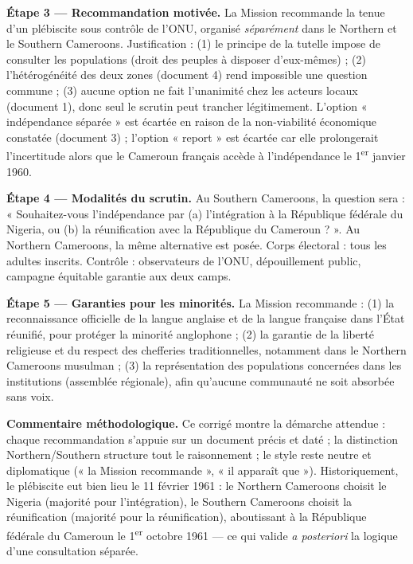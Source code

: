 \documentclass[11pt]{article}
\newcommand{\cle}[1]{{\popxbold\color{popdark}#1}}
\begin{document}
\begin{exoresolu}
\textbf{Étape 3 — Recommandation motivée.} La Mission recommande la tenue d'un \cle{plébiscite sous contrôle de l'ONU}, organisé \emph{séparément} dans le Northern et le Southern Cameroons. Justification : (1) le principe de la tutelle impose de consulter les populations (droit des peuples à disposer d'eux-mêmes) ; (2) l'hétérogénéité des deux zones (document 4) rend impossible une question commune ; (3) aucune option ne fait l'unanimité chez les acteurs locaux (document 1), donc seul le scrutin peut trancher légitimement. L'option « indépendance séparée » est écartée en raison de la non-viabilité économique constatée (document 3) ; l'option « report » est écartée car elle prolongerait l'incertitude alors que le Cameroun français accède à l'indépendance le 1\textsuperscript{er} janvier 1960.

\textbf{Étape 4 — Modalités du scrutin.} Au Southern Cameroons, la question sera : « Souhaitez-vous l'indépendance par (a) l'intégration à la République fédérale du Nigeria, ou (b) la réunification avec la République du Cameroun ? ». Au Northern Cameroons, la même alternative est posée. Corps électoral : tous les adultes inscrits. Contrôle : observateurs de l'ONU, dépouillement public, campagne équitable garantie aux deux camps.

\textbf{Étape 5 — Garanties pour les minorités.} La Mission recommande : (1) la reconnaissance officielle de la langue anglaise et de la langue française dans l'État réunifié, pour protéger la minorité anglophone ; (2) la garantie de la liberté religieuse et du respect des chefferies traditionnelles, notamment dans le Northern Cameroons musulman ; (3) la représentation des populations concernées dans les institutions (assemblée régionale), afin qu'aucune communauté ne soit absorbée sans voix.

\textbf{Commentaire méthodologique.} Ce corrigé montre la démarche attendue : chaque recommandation s'appuie sur un document précis et daté ; la distinction Northern/Southern structure tout le raisonnement ; le style reste neutre et diplomatique (« la Mission recommande », « il apparaît que »). Historiquement, le plébiscite eut bien lieu le 11 février 1961 : le Northern Cameroons choisit le Nigeria (majorité pour l'intégration), le Southern Cameroons choisit la réunification (majorité pour la réunification), aboutissant à la République fédérale du Cameroun le 1\textsuperscript{er} octobre 1961 — ce qui valide \emph{a posteriori} la logique d'une consultation séparée.
\end{exoresolu}
\end{document}
